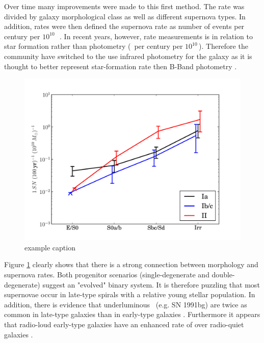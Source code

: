 Over time many improvements were made to this first method. The rate was divided by galaxy morphological class as well as different supernova types. In addition, rates were then defined the supernova rate as number of events per century per $10^{10}$\,\lsun\ \citep[e.g.][]{1991ARA&A..29..363V,1994ApJS...92..487T}. In recent years, however, rate measurements is in relation to star formation rather than photometry (\sn\ per century per $10^{10}$\,\msun).  Therefore the community \citep[e.g.][]{2005A&A...433..807M} have switched to the use infrared photometry for the galaxy as it is thought to better represent star-formation rate then B-Band photometry \citep{2003A&A...410...83H}. 
\begin{figure}[htbp] %
   \centering
   \includegraphics[width=\textwidth]{chapter1/plots/snrates_mannucci05.pdf} 
   \caption{example caption}
   \label{fig:snrates_mannucci05}
\end{figure}

Figure \ref{fig:snrates_mannucci05} clearly shows that there is a strong connection between morphology and supernova rates. 
Both progenitor scenarios (single-degenerate and double-degenerate) suggest an "evolved" binary system. It is therefore puzzling that most supernovae occur in late-type spirals with a relative young stellar population. 
In addition, there is evidence that underluminous \sneia\ (e.g. SN 1991bg) are twice as common in late-type galaxies than in early-type galaxies \citep{2001ApJ...554L.193H}. 
Furthermore it appears that radio-loud early-type galaxies have an enhanced rate of \sneia over radio-quiet galaxies \citep{2003ApJ...587L..71D}. 

